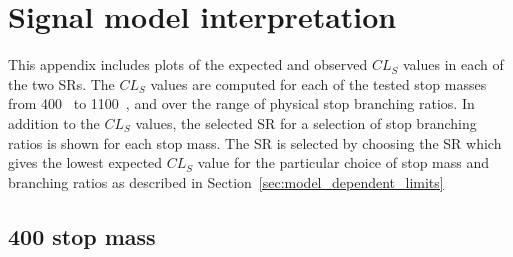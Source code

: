 \chapter[Signal model interpretation][Signal model interpretation]
        {Signal model interpretation}
\label{sec:axp_interpretation_plots}

This appendix includes plots of the expected and observed $CL_S$ values in each
of the two SRs.
The $CL_S$ values are computed for each of the tested stop masses from 400~\GeV
to 1100~\GeV, and over the range of physical stop branching ratios.
In addition to the $CL_S$ values, the selected SR for a selection of stop
branching ratios is shown for each stop mass.
The SR is selected by choosing the SR which gives the lowest expected $CL_S$
value for the particular choice of stop mass and branching ratios as described
in Section~\ref{sec:model_dependent_limits}

\newpage
\section{400 \texorpdfstring{\GeV}{GeV} stop mass}

